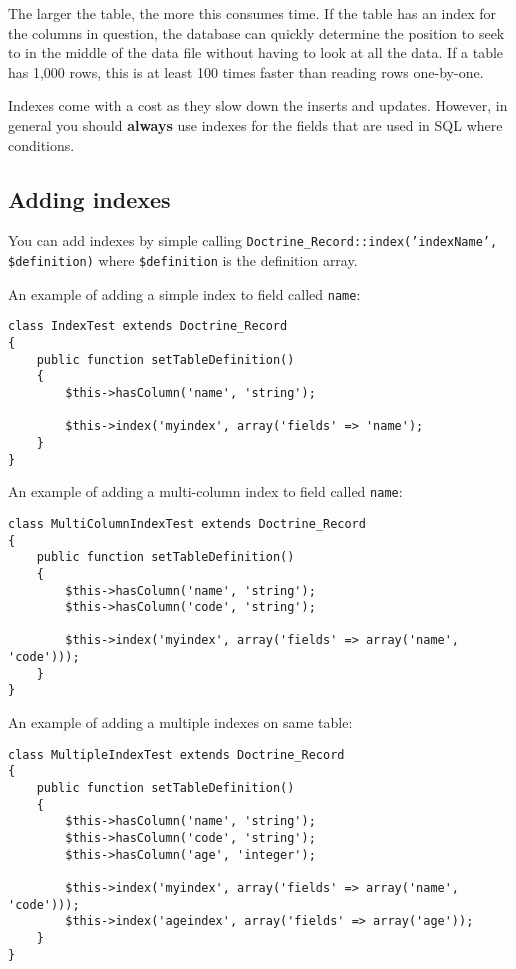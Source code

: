 \documentclass[11pt,a4paper]{report}
\begin{document}
The larger the table, the more this consumes time. If the table has an index for the columns in question, the database can quickly determine the position to seek to in the middle of the data file without having to look at all the data. If a table has 1,000 rows, this is at least 100 times faster than reading rows one-by-one.

Indexes come with a cost as they slow down the inserts and updates. However, in general you should \textbf{always} use indexes for the fields that are used in SQL where conditions.

\subsection{Adding indexes}
You can add indexes by simple calling \texttt{Doctrine\_Record::index('indexName', \$definition)} where \texttt{\$definition} is the definition array.

An example of adding a simple index to field called \texttt{name}:

\begin{verbatim}
class IndexTest extends Doctrine_Record
{
    public function setTableDefinition()
    {
        $this->hasColumn('name', 'string');

        $this->index('myindex', array('fields' => 'name');
    }
}
\end{verbatim}

An example of adding a multi-column index to field called \texttt{name}:

\begin{verbatim}
class MultiColumnIndexTest extends Doctrine_Record
{
    public function setTableDefinition()
    {
        $this->hasColumn('name', 'string');
        $this->hasColumn('code', 'string');

        $this->index('myindex', array('fields' => array('name', 'code')));
    }
}
\end{verbatim}

An example of adding a multiple indexes on same table:

\begin{verbatim}
class MultipleIndexTest extends Doctrine_Record
{
    public function setTableDefinition()
    {
        $this->hasColumn('name', 'string');
        $this->hasColumn('code', 'string');
        $this->hasColumn('age', 'integer');

        $this->index('myindex', array('fields' => array('name', 'code')));
        $this->index('ageindex', array('fields' => array('age'));
    }
}
\end{verbatim}
\end{document}
